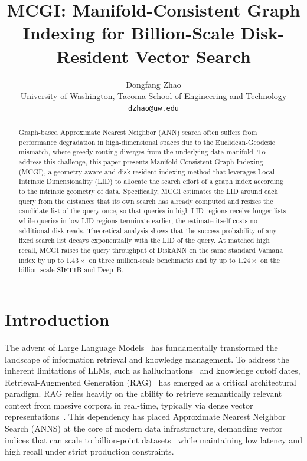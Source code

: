 \documentclass{article}
\title{MCGI: Manifold-Consistent Graph Indexing for Billion-Scale Disk-Resident Vector Search}
\author{
  Dongfang Zhao \\
  University of Washington, Tacoma School of Engineering and Technology \\
  \texttt{dzhao@uw.edu}
}
\theoremstyle{plain}
\theoremstyle{definition}
\theoremstyle{remark}
\newcommand{\ours}{MCGI\xspace}
\begin{document}
\maketitle 

\begin{abstract}
Graph-based Approximate Nearest Neighbor (ANN) search often suffers from performance degradation in high-dimensional spaces due to the Euclidean-Geodesic mismatch, where greedy routing diverges from the underlying data manifold. To address this challenge, this paper presents Manifold-Consistent Graph Indexing (MCGI), a geometry-aware and disk-resident indexing method that leverages Local Intrinsic Dimensionality (LID) to allocate the search effort of a graph index according to the intrinsic geometry of data. Specifically, MCGI estimates the LID around each query from the distances that its own search has already computed and resizes the candidate list of the query once, so that queries in high-LID regions receive longer lists while queries in low-LID regions terminate earlier; the estimate itself costs no additional disk reads. Theoretical analysis shows that the success probability of any fixed search list decays exponentially with the LID of the query. At matched high recall, \ours{} raises the query throughput of DiskANN on the same standard Vamana index by up to $1.43\times$ on three million-scale benchmarks and by up to $1.24\times$ on the billion-scale SIFT1B and Deep1B.
\end{abstract}

\section{Introduction}
\label{sec:intro}

The advent of Large Language Models~\cite{brown2020language, touvron2023llama} has fundamentally transformed the landscape of information retrieval and knowledge management. To address the inherent limitations of LLMs, such as hallucinations~\cite{ji2023survey} and knowledge cutoff dates, Retrieval-Augmented Generation (RAG)~\cite{lewis2020retrieval} has emerged as a critical architectural paradigm. RAG relies heavily on the ability to retrieve semantically relevant context from massive corpora in real-time, typically via dense vector representations~\cite{karpukhin2020dense}. This dependency has placed Approximate Nearest Neighbor Search (ANNS) at the core of modern data infrastructure, demanding vector indices that can scale to billion-point datasets~\cite{simhadri2022neurips} while maintaining low latency and high recall under strict production constraints.
\end{document}
